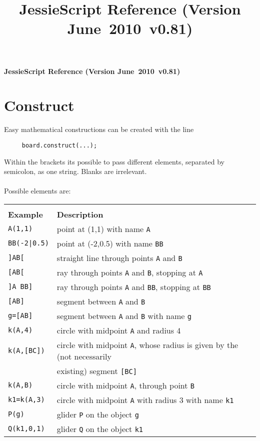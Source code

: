 \documentclass[10pt]{article}
\def\versionnumber{0.81}  %
\def\year{2010}
\def\month{June}
\def\version{\month\ \year\ v\versionnumber}
\begin{document}
\title{JessieScript Reference (Version \version)}
\begin{center} {\LARGE\textbf {JessieScript Reference (Version
\version)}}
\end{center}
\section{Construct}
Easy mathematical constructions can be created with the line
\begin{verbatim}
     board.construct(...);
\end{verbatim} Within the brackets its possible to pass different
elements, separated by semicolon, as one string. Blanks are
irrelevant.
\\\\ Possible elements are: \\ \begin{tabular}{|l|l|} \hline \\[-0.75em] {\large
\textbf{Example}} & {\large \textbf{Description}} \\
\hline\hline \verb+A(1,1)+ & point at (1,1) with name \verb'A'
\\ \hline \verb+BB(-2|0.5)+ & point at
(-2,0.5) with name \verb'BB' \\
\hline\verb+]AB[+ & straight line through points \verb'A' and \verb'B' \\
\hline\verb+[AB[+ &
ray through points \verb'A' and \verb'B', stopping at \verb'A' \\
\hline\verb+]A BB]+ & ray through points \verb'A' and \verb'BB',
stopping at \verb'BB'
\\ \hline\verb+[AB]+ & segment between \verb'A' and \verb'B' \\
\hline \verb+g=[AB]+ & segment between \verb'A' and \verb'B' with name \verb'g' \\
\hline\verb+k(A,4)+ & circle with midpoint \verb'A' and radius 4 \\
\hline\verb+k(A,[BC])+ & circle with midpoint \verb'A', whose
radius is given by the (not necessarily
\\ & existing) segment \verb'[BC]' \\ \hline\verb+k(A,B)+ & circle with midpoint \verb'A',
through point \verb'B' \\
\hline\verb+k1=k(A,3)+ & circle with midpoint \verb'A' with radius
3 with name \verb'k1'
\\ \hline\verb+P(g)+ & glider \verb'P' on the object \verb'g' \\
\hline\verb+Q(k1,0,1)+ & glider \verb'Q' on the object \verb'k1'

\end{tabular}
\end{document}
